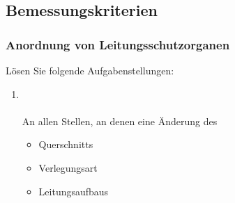 \subsection{Bemessungskriterien}
\subsubsection{Anordnung von Leitungsschutzorganen}

Lösen Sie folgende Aufgabenstellungen:
\begin{enumerate}
    \item   {} \\\\
            An allen Stellen, an denen eine Änderung des 
            \begin{itemize}
                \item Querschnitts
                \item Verlegungsart
                \item Leitungsaufbaus
            \end{itemize}


\end{enumerate}
